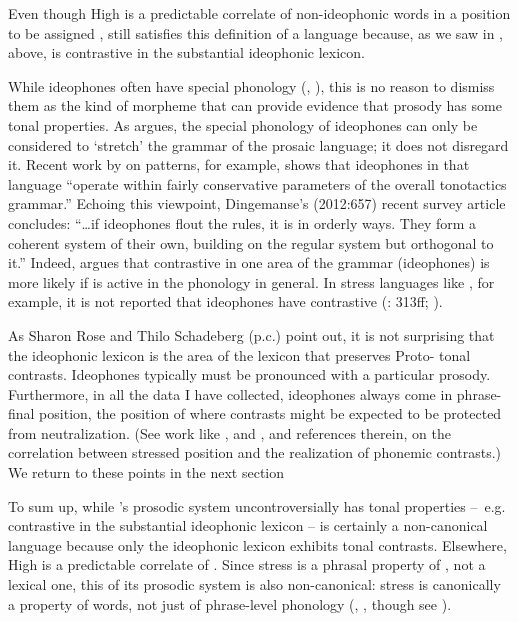 \documentclass[output=paper
,newtxmath
,modfonts
,nonflat]{langsci/langscibook}
\begin{document}
Even though High  is a predictable correlate of non-ideophonic words in a position to be assigned ,  still satisfies this definition of a  language because, as we saw in , above,  is contrastive in the substantial ideophonic lexicon.

While ideophones often have special phonology (\citealt{Newman2001}, \citealt{Dingemanse2012}), this is no reason to dismiss them as the kind of morpheme that can provide evidence that  prosody has some tonal properties. As \citet{Newman2001} argues, the special phonology of ideophones can only be considered to ‘stretch’ the grammar of the prosaic language; it does not disregard it. Recent work by \citet{Shih&Inkelas2015} on   patterns, for example, shows that ideophones in that language “operate within fairly conservative parameters of the overall  tonotactics grammar.” Echoing this viewpoint, Dingemanse’s (2012:657) recent survey article concludes: “…if ideophones flout the rules, it is in orderly ways. They form a coherent system of their own, building on the regular system but orthogonal to it.” Indeed, \citet{Mphande1989} argues that contrastive  in one area of the  grammar (ideophones) is more likely if  is active in the phonology in general. In stress languages like , for example, it is not reported that ideophones have contrastive  (\citealt{Ashton1969}: 313ff; \citealt{Lodhi2004}). 

As Sharon Rose and Thilo Schadeberg (p.c.) point out, it is not surprising that the ideophonic lexicon is the area of the  lexicon that preserves Proto- tonal contrasts. Ideophones typically must be pronounced with a particular prosody. Furthermore, in all the data I have collected, ideophones always come in phrase-final position, the position of  where  contrasts might be expected to be protected from neutralization. (See work like \citet{Beckman1997}, \citet{Harris2004} and \citet{Steriade1995}, and references therein, on the correlation between stressed position and the realization of phonemic contrasts.) We return to these points in the next section

To sum up, while ’s prosodic system uncontroversially has tonal properties –~e.g. contrastive  in the substantial ideophonic lexicon –  is certainly a non-canonical  language because only the ideophonic lexicon exhibits tonal contrasts. Elsewhere, High  is a predictable correlate of . Since stress is a phrasal property of , not a lexical one, this  of its prosodic system is also non-canonical: stress is canonically a property of words, not just of phrase-level phonology (\citealt{Hyman2012}, \citeyear{Hyman2014}, though see \citealt{Gordon2014}).
\end{document}
